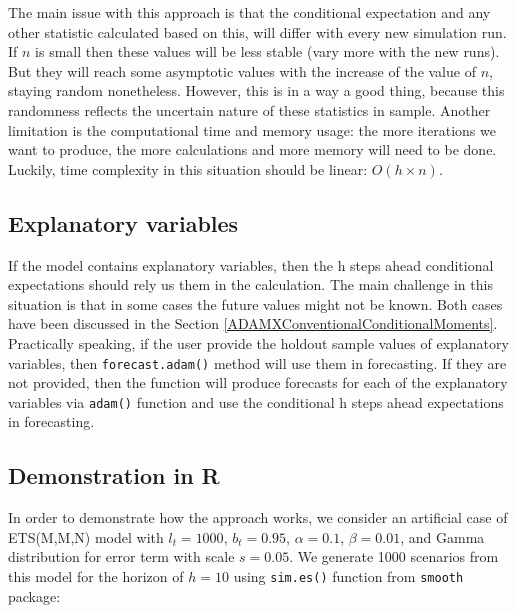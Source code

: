 \documentclass[
]{book}
\theoremstyle{definition}
\theoremstyle{definition}
\theoremstyle{definition}
\theoremstyle{definition}
\theoremstyle{remark}
\begin{document}
The main issue with this approach is that the conditional expectation and any other statistic calculated based on this, will differ with every new simulation run. If \(n\) is small then these values will be less stable (vary more with the new runs). But they will reach some asymptotic values with the increase of the value of \(n\), staying random nonetheless. However, this is in a way a good thing, because this randomness reflects the uncertain nature of these statistics in sample. Another limitation is the computational time and memory usage: the more iterations we want to produce, the more calculations and more memory will need to be done. Luckily, time complexity in this situation should be linear: \(O(h \times n)\).

\hypertarget{explanatory-variables}{%
\subsection{Explanatory variables}\label{explanatory-variables}}

If the model contains explanatory variables, then the h steps ahead conditional expectations should rely us them in the calculation. The main challenge in this situation is that in some cases the future values might not be known. Both cases have been discussed in the Section \ref{ADAMXConventionalConditionalMoments}. Practically speaking, if the user provide the holdout sample values of explanatory variables, then \texttt{forecast.adam()} method will use them in forecasting. If they are not provided, then the function will produce forecasts for each of the explanatory variables via \texttt{adam()} function and use the conditional h steps ahead expectations in forecasting.

\hypertarget{demonstration-in-r-1}{%
\subsection{Demonstration in R}\label{demonstration-in-r-1}}

In order to demonstrate how the approach works, we consider an artificial case of ETS(M,M,N) model with \(l_t=1000\), \(b_t=0.95\), \(\alpha=0.1\), \(\beta=0.01\), and Gamma distribution for error term with scale \(s=0.05\). We generate 1000 scenarios from this model for the horizon of \(h=10\) using \texttt{sim.es()} function from \texttt{smooth} package:
\end{document}
